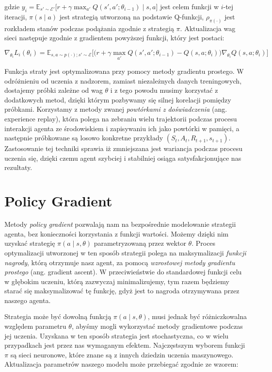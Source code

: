 \documentclass[licencjacka]{pracamgr}
\begin{document}
gdzie $ y_i = \mathbb{E}_{s' \sim \mathcal{E}'} \big[ r + \gamma \max_{a'} Q(s', a'; \theta_{i - 1}) \mid s, a \big] $ jest celem funkcji w $i$-tej iteracji, $\pi(s \mid a)$ jest strategią utworzoną na podstawie Q-funkcji, $\rho_{\pi(\cdot)} $ jest rozkładem stanów podczas podążania zgodnie z strategią $\pi$. Aktualizacja wag sieci następuje zgodnie z gradientem powyższej funkcji, który jest postaci:

$$ \nabla_{\theta_i}L_i(\theta_i) = \mathbb{E}_{s, a \sim p(\cdot); s' \sim \mathcal{E}} 
\Big[ \Big( r + \gamma \max_{a'} Q(s', a'; \theta_{i - 1}) - Q(s, a; \theta_i) \Big) \nabla_{\theta_i} Q(s, a; \theta_i) \Big] $$

Funkcja straty jest optymalizowana przy pomocy metody gradientu prostego. W odróżnieniu od uczenia z nadzorem, zamiast niezależnych danych treningowych, dostajemy próbki zależne od wag $\theta$ i z tego powodu musimy korzystać z dodatkowych metod, dzięki którym pozbywamy się silnej korelacji pomiędzy próbkami. Korzystamy z metody zwanej \emph{powtórkami z doświadczenia} (ang. experience replay), która polega na zebraniu wielu trajektorii podczas procesu interakcji agenta ze środowiskiem i zapisywaniu ich jako powtórki w pamięci, a następnie próbkowane są losowo konkretne przykłady $(S_t, A_t, R_{t+1}, s_{t+1})$. Zastosowanie tej techniki sprawia iż zmniejszana jest wariancja podczas procesu uczenia się, dzięki czemu agent szybciej i stabilniej osiąga satysfakcjonujące nas rezultaty.


\section{Policy Gradient}

Metody \emph{policy gradient} \cite{policy-gradient-sutton} pozwalają nam na bezpośrednie modelowanie strategii agenta, bez konieczności korzystania z funkcji wartości. Możemy dzięki nim uzyskać strategię $\pi(a \mid s, \theta)$ parametryzowaną przez wektor $\theta$. Proces optymalizacji utworzonej w ten sposób strategii polega na maksymalizacji \emph{funkcji nagrody}, którą otrzymuje nasz agent, za pomocą \emph{wzrostowej metody gradientu prostego} (ang. gradient ascent). W przeciwieństwie do standardowej funkcji celu w głębokim uczeniu, którą zazwyczaj minimalizujemy, tym razem będziemy starać się maksymalizować tę funkcję, gdyż jest to nagroda otrzymywana przez naszego agenta.

Strategia może być dowolną funkcją $\pi(a \mid s, \theta)$, musi jednak być różniczkowalna względem parametru $\theta$, abyśmy mogli wykorzystać metody gradientowe podczas jej uczenia. Uzyskana w ten sposób strategia jest stochastyczna, co w wielu przypadkach jest przez nas wymaganym efektem. Najczęstszym wyborem funkcji $\pi$ są sieci neuronowe, które znane są z innych dziedzin uczenia maszynowego. Aktualizacja parametrów naszego modelu może przebiegać zgodnie ze wzorem:
\end{document}
